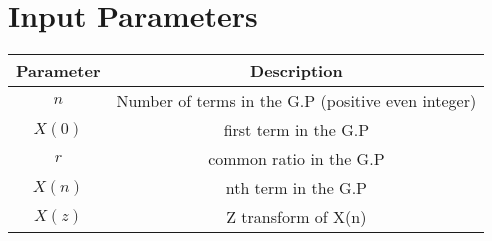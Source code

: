 \documentclass{article}
\begin{document}
\section*{Input Parameters}
\begin{center}
\begin{tabular}{|c|c|}
\hline
Parameter & Description \\
\hline
\( n \) & Number of terms in the G.P (positive even integer) \\
\hline
\(X(0) \) & first term in the G.P \\
\hline
\( r \) & common ratio in the G.P \\
\hline
\( X(n) \) & nth term in the G.P \\
\hline
\( X(z) \) & Z transform of X(n) \\
\hline
\end{tabular}
\end{center}
\end{document}
